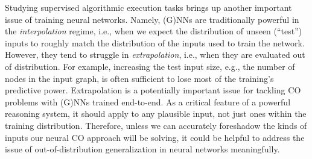 \documentclass[twoside,11pt]{article}
\newcommand{\cm}[1]{{{\textcolor{orange}{\textbf{[CM:} {#1}\textbf{]}}}}}
\begin{document}

Studying supervised algorithmic execution tasks brings up another important issue of training neural networks. Namely, (G)NNs are traditionally powerful in the \emph{interpolation} regime, i.e., when we expect the distribution of unseen (``test'') inputs to roughly match the distribution of the inputs used to train the network. However, they tend to struggle in \emph{extrapolation}, i.e., when they are evaluated out of distribution. For example, increasing the test input size, e.g., the number of nodes in the input graph, is often sufficient to lose most of the training's predictive power. Extrapolation is a potentially important issue for tackling CO problems with (G)NNs trained end-to-end. As a critical feature of a powerful reasoning system, it should apply to {any} plausible input, not just ones within the training distribution. Therefore, unless we can accurately foreshadow the kinds of inputs our neural CO approach will be solving, it could be helpful to address the issue of out-of-distribution generalization in neural networks meaningfully. 
\end{document}
